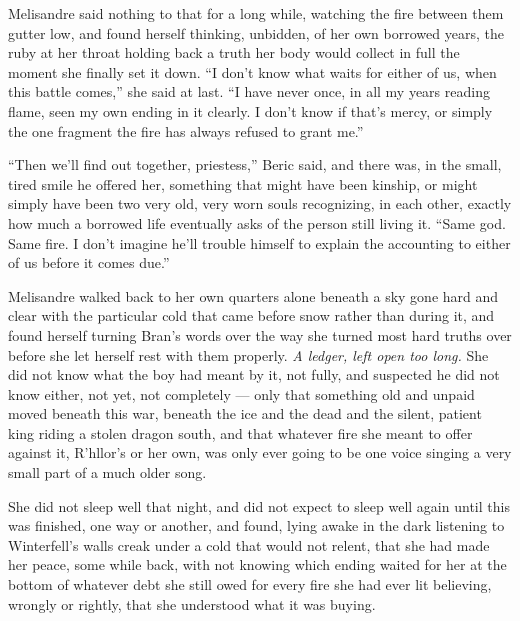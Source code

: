 Melisandre said nothing to that for a long while, watching the fire between them gutter low, and found herself thinking, unbidden, of her own borrowed years, the ruby at her throat holding back a truth her body would collect in full the moment she finally set it down. “I don’t know what waits for either of us, when this battle comes,” she said at last. “I have never once, in all my years reading flame, seen my own ending in it clearly. I don’t know if that’s mercy, or simply the one fragment the fire has always refused to grant me.”

“Then we’ll find out together, priestess,” Beric said, and there was, in the small, tired smile he offered her, something that might have been kinship, or might simply have been two very old, very worn souls recognizing, in each other, exactly how much a borrowed life eventually asks of the person still living it. “Same god. Same fire. I don’t imagine he’ll trouble himself to explain the accounting to either of us before it comes due.”

\sceneBreak

Melisandre walked back to her own quarters alone beneath a sky gone hard and clear with the particular cold that came before snow rather than during it, and found herself turning Bran’s words over the way she turned most hard truths over before she let herself rest with them properly. \textit{A ledger, left open too long.} She did not know what the boy had meant by it, not fully, and suspected he did not know either, not yet, not completely — only that something old and unpaid moved beneath this war, beneath the ice and the dead and the silent, patient king riding a stolen dragon south, and that whatever fire she meant to offer against it, R’hllor’s or her own, was only ever going to be one voice singing a very small part of a much older song.

She did not sleep well that night, and did not expect to sleep well again until this was finished, one way or another, and found, lying awake in the dark listening to Winterfell’s walls creak under a cold that would not relent, that she had made her peace, some while back, with not knowing which ending waited for her at the bottom of whatever debt she still owed for every fire she had ever lit believing, wrongly or rightly, that she understood what it was buying.